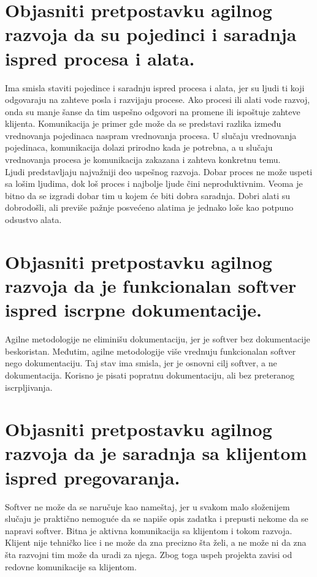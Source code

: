 \documentclass[a4paper]{article}
\begin{document}
\section{Objasniti pretpostavku agilnog razvoja da su pojedinci i saradnja ispred procesa i alata.}
  Ima smisla staviti pojedince i saradnju ispred procesa i alata, jer su ljudi ti koji odgovaraju
  na zahteve posla i razvijaju procese. Ako procesi ili alati vode razvoj, onda su manje šanse 
  da tim uspešno odgovori na promene ili ispoštuje zahteve klijenta. Komunikacija
  je primer gde može da se predstavi razlika između vrednovanja pojedinaca naspram vrednovanja
  procesa. U slučaju vrednovanja pojedinaca, komunikacija dolazi prirodno kada je potrebna, a u 
  slučaju vrednovanja procesa je komunikacija zakazana i zahteva konkretnu temu. \\
  \indent Ljudi predstavljaju najvažniji deo uspešnog razvoja. Dobar proces ne može uspeti sa lošim ljudima,
  dok loš proces i najbolje ljude čini neproduktivnim. Veoma je bitno da se izgradi dobar tim u kojem
  će biti dobra saradnja. Dobri alati su dobrodošli, ali previše pažnje posvećeno alatima je 
  jednako loše kao potpuno odsustvo alata.

\section{Objasniti pretpostavku agilnog razvoja da je funkcionalan softver ispred iscrpne dokumentacije.}
  Agilne metodologije ne eliminišu dokumentaciju, jer je softver bez dokumentacije beskoristan.
  Međutim, agilne metodologije više vrednuju funkcionalan softver nego dokumentaciju. Taj stav ima 
  smisla, jer je osnovni cilj softver, a ne dokumentacija. Korisno je pisati popratnu dokumentaciju, 
  ali bez preteranog iscrpljivanja. 

\section{Objasniti pretpostavku agilnog razvoja da je saradnja sa klijentom ispred pregovaranja.}
  Softver ne može da se naručuje kao nameštaj, jer u svakom malo složenijem slučaju je praktično 
  nemoguće da se napiše opis zadatka i prepusti nekome da se napravi softver. Bitna je aktivna
  komunikacija sa klijentom i tokom razvoja. Klijent nije tehničko lice i ne može da zna precizno
  šta želi, a ne može ni da zna šta razvojni tim može da uradi za njega. Zbog toga uspeh projekta 
  zavisi od redovne komunikacije sa klijentom.
\end{document}
